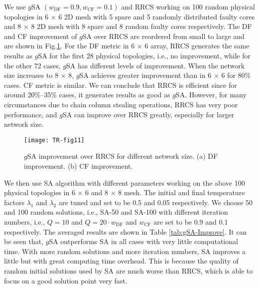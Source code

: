 We use $g$SA $\left(w_{\mathrm{DF}}=0.9, w_{\mathrm{CF}}=0.1\right)$ and RRCS working on 100 random physical topologies in 6 $\times$ 6 2D mesh with 5 spare and 5 randomly distributed faulty cores and 8 $\times$ 8 2D mesh with 8 spare and 8 random faulty cores respectively. The DF and CF improvement of $g$SA over RRCS are reordered from small to large and are shown in Fig.\ref{fig11}. For the DF metric in 6 $\times$ 6 array, RRCS generates the same results as $g$SA for the first 28 physical topologies, i.e., no improvement, while for the other 72 cases, $g$SA has different levels of improvement. When the network size increases to 8 $\times$ 8, $g$SA achieves greater improvement than in 6 $\times$ 6 for 80\% cases. CF metric is similar. We can conclude that RRCS is efficient since for around 20\%–35\% cases, it generates results as good as $g$SA. However, for many circumstances due to chain column stealing operations, RRCS has very poor performance, and $g$SA can improve over RRCS greatly, especially for larger network size.

\begin{figure}[h]
      \centering
        \texttt{[image: TR-fig11]}
          \caption{$g$SA improvement over RRCS for different network size. (a) DF improvement. (b) CF improvement.}
        \label{fig11}
\end{figure}

We then use SA algorithm with different parameters working on the above 100 physical topologies in 6 $\times$ 6 and 8 $\times$ 8 mesh. The initial and final temperature factors  $\lambda_{1}$   and $\lambda_{2}$  are tuned and set to be 0.5 and 0.05 respectively. We choose 50 and 100 random solutions, i.e., SA-50 and SA-100 with different iteration numbers, i.e., $Q=10$ and $Q=20 \cdot w_{\mathrm{DF}} $  and $w_{\mathrm{CF}}$ are set to be 0.9 and 0.1 respectively. The averaged results are shown in Table \ref{tab:gSA-Improve}. It can be seen that, $g$SA outperforms SA in all cases with very little computational time. With more random solutions and more iteration numbers, SA improves a little but with great computing time overhead. This is because the quality of random initial solutions used by SA are much worse than RRCS, which is able to focus on a good solution point very fast.

